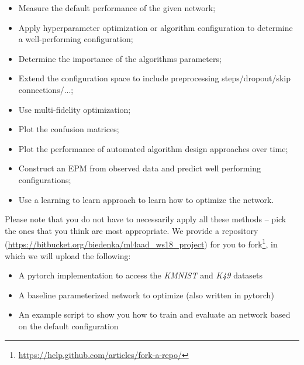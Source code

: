 \documentclass[10pt,a4paper]{article}
\begin{document}
		\begin{itemize}
			\item Measure the default performance of the given network;
			\item Apply hyperparameter optimization or algorithm configuration to determine a well-performing configuration;
			\item Determine the importance of the algorithms parameters;
			\item Extend the configuration space to include preprocessing steps/dropout/skip connections/...;
			\item Use multi-fidelity optimization;
			\item Plot the confusion matrices;
			\item Plot the performance of automated algorithm design approaches over time; 
			\item Construct an EPM from observed data and predict well performing configurations;
			\item Use a learning to learn approach to learn how to optimize the network. 
		\end{itemize}
		\noindent
		Please note that you do not have to necessarily apply all these methods -- pick the ones that you think are most appropriate.
		We provide a repository (\url{https://bitbucket.org/biedenka/ml4aad_ws18_project}) for you to fork\footnote{\url{https://help.github.com/articles/fork-a-repo/}}, in which we will upload the following:
		\begin{itemize}
			\item A pytorch implementation to access the \textit{KMNIST} and \textit{K49} datasets
			\item A baseline parameterized network to optimize (also written in pytorch)
			\item An example script to show you how to train and evaluate an network based on the default configuration
		\end{itemize}
		
\end{document}
